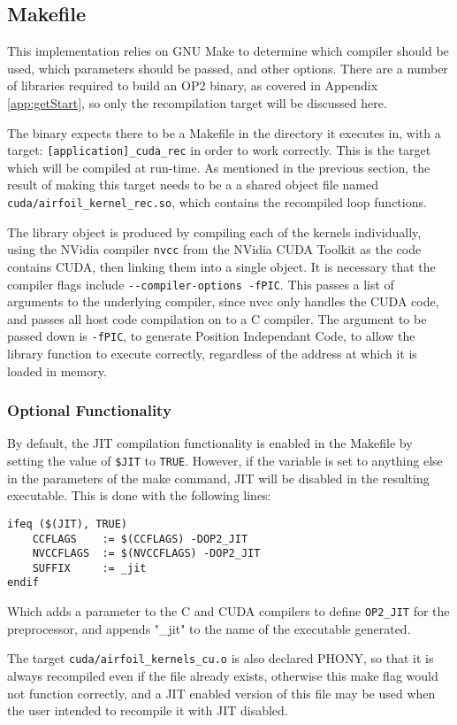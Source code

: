 \subsection{Makefile}
\label{ss:make}
This implementation relies on GNU Make\cite{make} to determine which compiler should be used, which parameters should be passed, and other options. There are a number of libraries required to build an OP2 binary, as covered in Appendix \ref{app:getStart}, so only the recompilation target will be discussed here.
\par
The binary expects there to be a Makefile in the directory it executes in, with a target: \verb|[application]_cuda_rec| in order to work correctly. This is the target which will be compiled at run-time. As mentioned in the previous section, the result of making this target needs to be a a shared object file named \verb|cuda/airfoil_kernel_rec.so|, which contains the recompiled loop functions.
\par
The library object is produced by compiling each of the kernels individually, using the NVidia compiler \verb|nvcc| from the NVidia CUDA Toolkit\cite{nvcc,toolkit} as the code contains CUDA, then linking them into a single object. It is necessary that the compiler flags include \verb|--compiler-options -fPIC|. This passes a list of arguments to the underlying compiler, since nvcc only handles the CUDA code, and passes all host code compilation on to a C compiler. The argument to be passed down is \verb|-fPIC|, to generate Position Independant Code, to allow the library function to execute correctly, regardless of the address at which it is loaded in memory.
\subsubsection{Optional Functionality}
By default, the JIT compilation functionality is enabled in the Makefile by setting the value of \verb|$JIT| to \verb|TRUE|. However, if the variable is set to anything else in the parameters of the make command, JIT will be disabled in the resulting executable. This is done with the following lines:
\begin{lstlisting}[linewidth = \textwidth, framesep=0pt]
ifeq ($(JIT), TRUE)
	CCFLAGS    := $(CCFLAGS) -DOP2_JIT
	NVCCFLAGS  := $(NVCCFLAGS) -DOP2_JIT
	SUFFIX     := _jit
endif
\end{lstlisting}
Which adds a parameter to the C and CUDA compilers to define \verb|OP2_JIT| for the preprocessor, and appends "\_jit" to the name of the executable generated.
\par
The target \verb|cuda/airfoil_kernels_cu.o| is also declared PHONY, so that it is always recompiled even if the file already exists, otherwise this make flag would not function correctly, and a JIT enabled version of this file may be used when the user intended to recompile it with JIT disabled.
